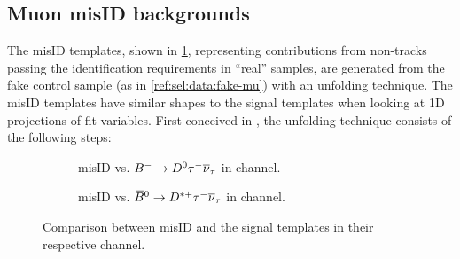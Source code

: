 \subsection{Muon misID backgrounds}
\label{ref:fit:tmpl:misid}

The \muon misID templates,
shown in \cref{fig:misid-vs-sig},
representing contributions from non-\muon tracks passing the \muon
identification requirements in ``real'' \muon samples,
are generated from the fake \muon control sample
(as in \cref{ref:sel:data:fake-mu}) with an unfolding technique.
The \muon misID templates have similar shapes to the signal templates when
looking at 1D projections of fit variables.
First conceived in \cite{LHCb-ANA-2016-059}, the unfolding technique
consists of the following steps:

\begin{figure}[htb]
    \centering
    \begin{subfigure}{0.9\textwidth}
        \centering
        \caption{
            \muon misID vs. ${{{B}^-}} \rightarrow {\ensuremath{{D}^0}}{\ensuremath{\tau^-}}{\ensuremath{{\overline{\nu}}_\tau}}$ in \Dz channel.
        }
    \end{subfigure}

    \begin{subfigure}{0.9\textwidth}
        \centering
        \caption{
            \muon misID vs. ${{\kern 0.18em\overline{\kern -0.18em B}}{}^0} \rightarrow {\ensuremath{{D}^{*+}}}{\ensuremath{\tau^-}}{\ensuremath{{\overline{\nu}}_\tau}}$ in \Dstar channel.
        }
    \end{subfigure}

    \caption{
        Comparison between misID and the signal templates in their
        respective channel.
    }
    \label{fig:misid-vs-sig}
\end{figure}

